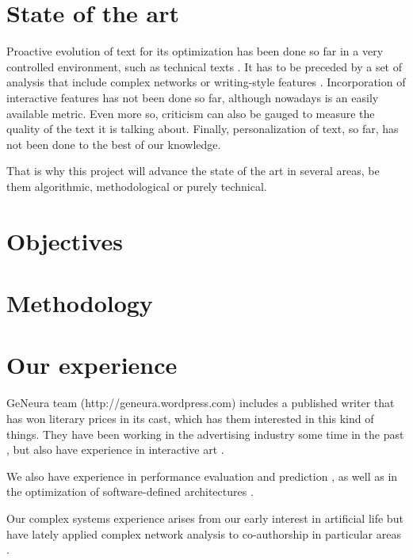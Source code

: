 \documentclass[a4paper,12pt,twocolumn]{article}
\begin{document}
\section{State of the art}

Proactive evolution of text for its optimization has been done so far
in a very controlled environment, such as technical texts
\cite{Rascu06acontrolled,hernandez2004checking}. It has to be preceded by a set of analysis
that include complex networks
\cite{1367-2630-14-4-043029,0295-5075-100-5-58002} or writing-style
features \cite{ASI:ASI20316}. Incorporation of interactive features
has not been done so far, although nowadays is an easily available
metric. Even more so, criticism can also be gauged to measure the
quality of the text it is talking about. Finally, personalization of
text, so far, has not been done to the best of our knowledge.

That is why this project will advance the state of the art in several
areas, be them algorithmic, methodological or purely technical.

\section{Objectives}
\label{sec:obj}

\section{Methodology}
\label{sec:meth}

\section{Our experience}
\label{sec:exp}

GeNeura team (http://geneura.wordpress.com) includes a published
writer that has won literary prices in its cast, which has them
interested in this kind of things. They have been working in the
advertising industry some time in the past
\cite{merelo:ecal97,AISB97}, but also have experience in interactive
art \cite{DBLP:conf/cec/TrujilloVVG13,DBLP:conf/cec/FernandesIBRG11}.


We also have experience in performance evaluation and prediction
\cite{castillo:evostar08,hardwareevo}, as well as in the optimization of
software-defined architectures \cite{gecco08:castillo}.

Our complex systems experience arises from our early interest in
artificial life \cite{ecal93} but have lately applied complex network
analysis to co-authorship in particular areas
\cite{ec-network-2007,merelo2013complex,DBLP:journals/corr/abs-1108-0261}. 
\end{document}

